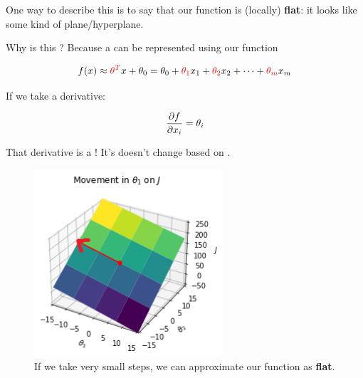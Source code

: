         One way to describe this is to say that our function is (locally) \textbf{flat}: it looks like some kind of plane/hyperplane.
            \\
        
        \begin{clarification}
            Why is this ? Because a  can be represented using our  function 
            
            \begin{equation*}
                f(x) 
                \approx
                \textcolor{red}{\theta^T}x+\theta_0
                =
                \theta_0 + \textcolor{red}{\theta_1}x_1+\textcolor{red}{\theta_2}x_2+\dots+ \textcolor{red}{\theta_m}x_m
            \end{equation*}
            
            If we take a derivative:
            
            \begin{equation*}
                \frac{\partial f}{\partial x_i}
                =
                \theta_i
            \end{equation*}
            
            That derivative is a ! It's doesn't change based on .
        \end{clarification}
        
        \begin{figure}[H]
            \centering
                \includegraphics[width=70mm,scale=0.5]{images/gradient_descent_images/theta1_movement_plane.png}
            \caption*{If we take very small steps, we can approximate our function as \textbf{flat}.}
        \end{figure}
        
